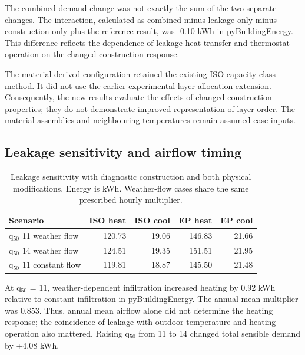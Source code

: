 The combined demand change was not exactly the sum of the two separate changes. The interaction, calculated as combined minus leakage-only minus construction-only plus the reference result, was -0.10 kWh in pyBuildingEnergy. This difference reflects the dependence of leakage heat transfer and thermostat operation on the changed construction response.

The material-derived configuration retained the existing ISO capacity-class method. It did not use the earlier experimental layer-allocation extension. Consequently, the new results evaluate the effects of changed construction properties; they do not demonstrate improved representation of layer order. The material assemblies and neighbouring temperatures remain assumed case inputs.

\subsection{Leakage sensitivity and airflow timing}

\begin{table}[htbp]\centering\small

\caption{Leakage sensitivity with diagnostic construction and both physical modifications. Energy is kWh. Weather-flow cases share the same prescribed hourly multiplier.}

\begin{tabularx}{\textwidth}{@{}Xrrrr@{}}

\toprule

Scenario & ISO heat & ISO cool & EP heat & EP cool \\

\midrule

q$_{50}$ 11 weather flow & 120.73 & 19.06 & 146.83 & 21.66 \\

q$_{50}$ 14 weather flow & 124.51 & 19.35 & 151.51 & 21.95 \\

q$_{50}$ 11 constant flow & 119.81 & 18.87 & 145.50 & 21.48 \\

\bottomrule

\end{tabularx}

\end{table}

At q$_{50}$ = 11, weather-dependent infiltration increased heating by 0.92 kWh relative to constant infiltration in pyBuildingEnergy. The annual mean multiplier was 0.853. Thus, annual mean airflow alone did not determine the heating response; the coincidence of leakage with outdoor temperature and heating operation also mattered. Raising q$_{50}$ from 11 to 14 changed total sensible demand by +4.08 kWh.


